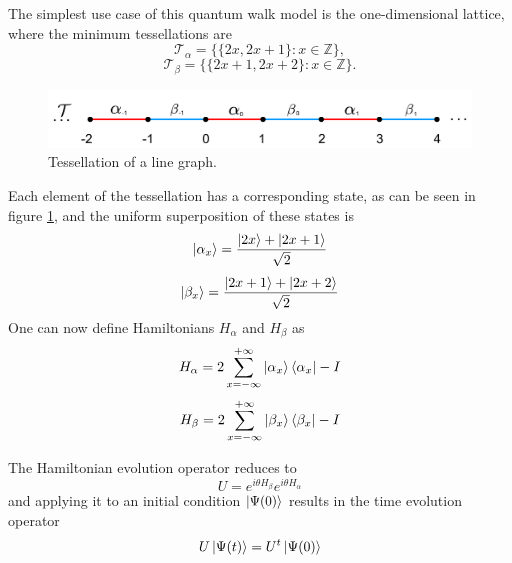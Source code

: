 \documentclass[../../dissertation.tex]{subfiles}
\begin{document}
The simplest use case of this quantum walk model is the one-dimensional
lattice, where the minimum tessellations are
\begin{equation}
	\mathscr{T}_{\alpha}= \{\{2x,2x+1\}\colon x \in \mathbb{Z}\},
\end{equation}
\begin{equation}
	\mathscr{T}_{\beta}= \{\{2x+1,2x+2\}\colon x \in \mathbb{Z}\}.
\end{equation}
\begin{figure}[!h]
	\centering
	\includegraphics[scale=0.40]{img/StagQuantumWalk/tesselation.png}
	\caption{Tessellation of a line graph.} 
	\label{fig:stagQWTesselation}
\end{figure}
Each element of the tessellation has a corresponding state, as can be seen in
figure \ref{fig:stagQWTesselation}, and the uniform superposition of these
states is
\begin{equation}
	\ket{\alpha_x} = \frac{\ket{2x} + \ket{2x+1}}{\sqrt{2}}
\end{equation}
\begin{equation}
	\ket{\beta_x} = \frac{\ket{2x+1}+\ket{2x+2}}{\sqrt{2}}
\end{equation}
One can now define Hamiltonians $H_\alpha$ and $H_\beta$ as 
\begin{equation}
	H_\alpha = 2\sum_{x=-\infty}^{+\infty}\ket{\alpha_{x}}\bra{\alpha_x} - I
	\label{eq:stagSimulHalpha}
\end{equation}
\begin{equation}
	H_\beta = 2\sum_{x=-\infty}^{+\infty}\ket{\beta_{x}}\bra{\beta_x} - I
	\label{eq:stagSimulHbeta}
\end{equation}\par
The Hamiltonian evolution operator reduces to
\begin{equation}
	U = e^{i\theta H_\beta}e^{i\theta H_\alpha}
	\label{eq:stagSimulUniOp}
\end{equation}
and applying it to an initial condition $\ket{\Psi(0)}$ results in the time
evolution operator
\begin{equation}
	U\ket{\Psi(t)} = U^t\ket{\Psi(0)}
\end{equation}\par
\end{document}
